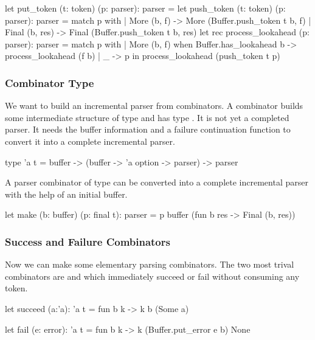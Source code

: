 \begin{ocaml}
  let put_token (t: token) (p: parser): parser =
    let push_token (t: token) (p: parser): parser =
      match p with
      | More (b, f) ->
          More (Buffer.push_token t b, f)
      | Final (b, res) ->
          Final (Buffer.push_token t b, res)
    let rec process_lookahead (p: parser): parser =
      match p with
      | More (b, f) when Buffer.has_lookahead b ->
          process_lookahead (f b)
      | _ ->
          p
    in
    process_lookahead (push_token t p)
\end{ocaml}



\subsubsection{Combinator Type}

We want to build an incremental parser from combinators. A combinator builds
some intermediate structure of type  and has type . It is
not yet a completed parser. It needs the buffer information and a failure
continuation function to convert it into a complete incremental parser.

\begin{ocaml}
  type 'a t =
    buffer -> (buffer -> 'a option -> parser) -> parser
\end{ocaml}


A parser combinator of type  can be converted into a complete
incremental parser with the help of an initial buffer.

\begin{ocaml}
  let make (b: buffer) (p: final t): parser =
    p buffer (fun b res -> Final (b, res))
\end{ocaml}





\subsubsection{Success and Failure Combinators}


Now we can make some elementary parsing combinators. The two most trival
combinators are  and  which immediately succeed or
fail without consuming any token.

\begin{ocaml}
  let succeed (a:'a): 'a t =
     fun b k -> k b (Some a)

  let fail (e: error): 'a t =
     fun b k -> k (Buffer.put_error e b) None
\end{ocaml}



